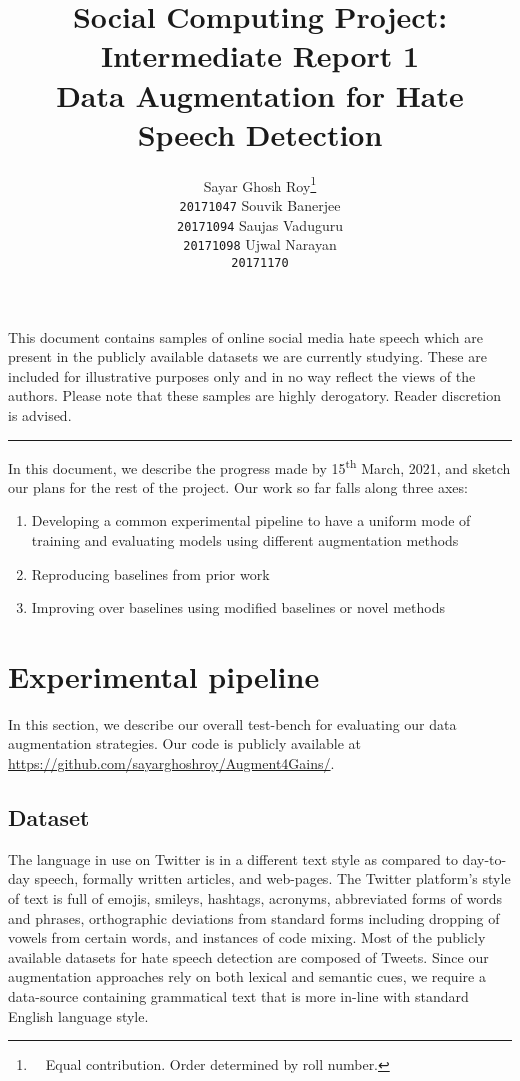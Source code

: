 \documentclass[11pt,a4paper]{article}
\title{{\normalsize Social Computing Project: Intermediate Report 1} \vspace{0.18cm} \\ Data Augmentation for Hate Speech Detection}
\author{Sayar Ghosh Roy\thanks{\ \ Equal contribution. Order determined by roll number.} \\ \texttt{20171047} \And
        Souvik Banerjee\footnotemark[1] \\ \texttt{20171094} \And
        Saujas Vaduguru\footnotemark[1] \\ \texttt{20171098} \And
        Ujwal Narayan\footnotemark[1] \\ \texttt{20171170}}
\date{}
\newcommand\Warning{%
 \makebox[1.4em][c]{%
 \makebox[0pt][c]{\raisebox{.1em}{\small!}}%
 \makebox[0pt][c]{\Large$\bigtriangleup$}}}%
\begin{document}
\maketitle

\Warning This document contains samples of online social media hate speech which are present in the publicly available datasets we are currently studying. These are included for illustrative purposes only and in no way reflect the views of the authors. Please note that these samples are highly derogatory. Reader discretion is advised.

\vspace{4mm}
\hrule
\vspace{4mm}

In this document, we describe the progress made by 15\textsuperscript{th} March, 2021, and sketch our plans for the rest of the project. Our work so far falls along three axes:
\begin{enumerate}
    \item Developing a common experimental pipeline to have a uniform mode of training and evaluating models using different augmentation methods
    \vspace{-0.28cm}
    \item Reproducing baselines from prior work
    \vspace{-0.28cm}
    \item Improving over baselines using modified baselines or novel methods
\end{enumerate}

\section{Experimental pipeline}
In this section, we describe our overall test-bench for evaluating our data augmentation strategies. Our code is publicly available at \url{https://github.com/sayarghoshroy/Augment4Gains/}.

\subsection{Dataset}
The language in use on Twitter is in a different text style as compared to day-to-day speech, formally written articles, and web-pages. The Twitter platform’s style of text is full of emojis, smileys, hashtags, acronyms, abbreviated forms of words and phrases, orthographic deviations from standard forms including dropping of vowels from certain words, and instances of code mixing. Most of the publicly available datasets for hate speech detection are composed of Tweets. Since our augmentation approaches rely on both lexical and semantic cues, we require a data-source containing grammatical text that is more in-line with standard English language style.
\end{document}
